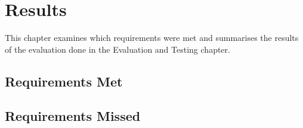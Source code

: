 \chapter{Results}
  This chapter examines which requirements were met and summarises the results of the evaluation done in the Evaluation and Testing chapter.

  \section{Requirements Met}
  \section{Requirements Missed}
